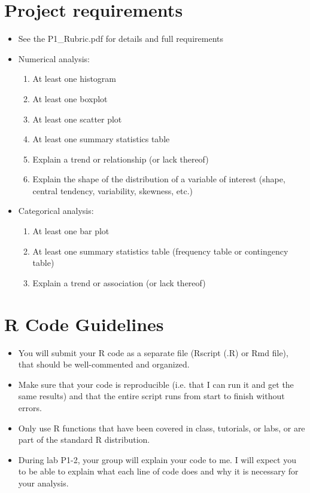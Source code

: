 \documentclass[12pt]{article}
\begin{document}
\section*{Project requirements}
\begin{itemize}
    \item See the P1\_Rubric.pdf for details and full requirements
    \item Numerical analysis:
    \begin{enumerate}
        \item At least one histogram
        \item At least one boxplot
        \item At least one scatter plot
        \item At least one summary statistics table
        \item Explain a trend or relationship (or lack thereof)
        \item Explain the shape of the distribution of a variable of interest (shape, central tendency, variability, skewness, etc.)
    \end{enumerate}
    \item Categorical analysis:
    \begin{enumerate}
        \item At least one bar plot
        \item At least one summary statistics table (frequency table or contingency table)
        \item Explain a trend or association (or lack thereof)
    \end{enumerate}
\end{itemize}

\section*{R Code Guidelines}
\begin{itemize}
    \item You will submit your R code as a separate file (Rscript (.R) or Rmd file), that should be well-commented and organized. 
    \item Make sure that your code is reproducible (i.e. that I can run it and get the same results) and that the entire script runs from start to finish without errors. 
    \item Only use R functions that have been covered in class, tutorials, or labs, or are part of the standard R distribution.
    \item During lab P1-2, your group will explain your code to me. I will expect you to be able to explain what each line of code does and why it is necessary for your analysis.
\end{itemize}
\end{document}
